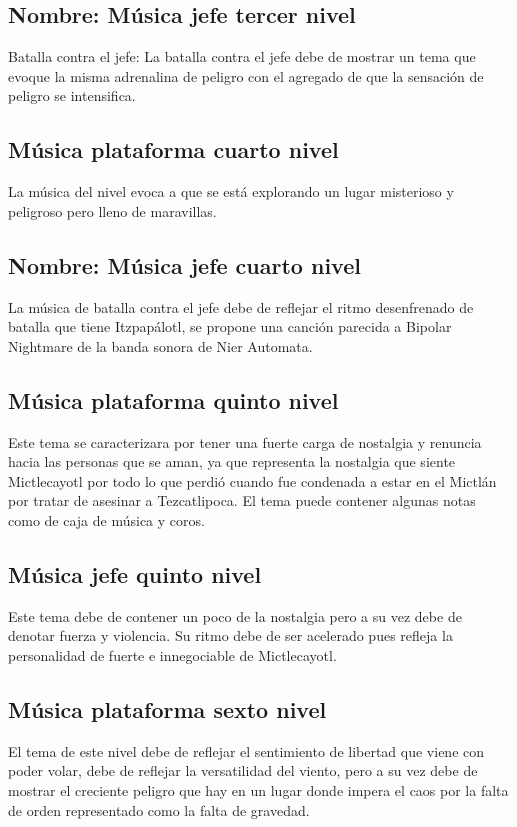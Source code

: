 \subsection{Nombre: Música jefe tercer nivel} \label{Musica:N03_ZN02}
Batalla contra el jefe: La batalla contra el jefe debe de mostrar un tema que evoque la misma adrenalina de peligro con el agregado de que la sensación de peligro se intensifica.

\subsection{Música plataforma cuarto nivel}\label{Musica:N04_ZN01}
La música del nivel evoca a que se está explorando un lugar misterioso y peligroso pero lleno de maravillas.
\subsection{Nombre: Música jefe cuarto nivel} \label{Musica:N04_ZN02}
La música de batalla contra el jefe debe de reflejar el ritmo desenfrenado de batalla que tiene Itzpapálotl, se propone una canción parecida a Bipolar Nightmare de la banda sonora de Nier Automata.

\subsection{Música plataforma quinto nivel} \label{Musica:N05_ZN01}
Este tema se caracterizara por tener una fuerte carga de nostalgia y renuncia hacia las personas que se aman, ya que representa la nostalgia que siente Mictlecayotl por todo lo que perdió cuando fue condenada a estar en el Mictlán por tratar de asesinar a Tezcatlipoca. El tema puede contener algunas notas como de caja de música y coros.

\subsection{Música jefe quinto nivel} \label{Musica:N05_ZN02}
Este tema debe de contener un poco de la nostalgia pero a su vez debe de denotar fuerza y violencia. Su ritmo debe de ser acelerado pues refleja la personalidad de fuerte e innegociable de Mictlecayotl. 


\subsection{Música plataforma sexto nivel} \label{Musica:N06_ZN01}
El tema de este nivel debe de reflejar el sentimiento de libertad que viene con poder volar, debe de reflejar la versatilidad del viento, pero a su vez debe de mostrar el creciente peligro que hay en un lugar donde impera el caos por la falta de orden representado como la falta de gravedad. 

